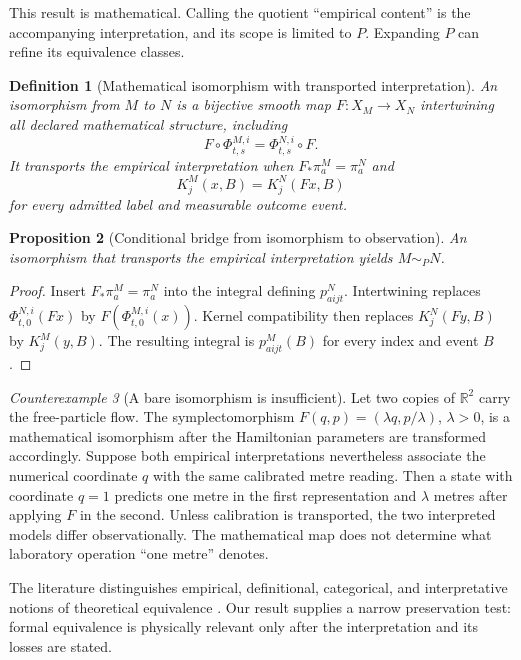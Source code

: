 \documentclass[11pt]{article}
\newtheorem{definition}{Definition}[section]
\newtheorem{proposition}[definition]{Proposition}
\theoremstyle{remark}
\newtheorem{counterexample}[definition]{Counterexample}
\newcommand{\Real}{\mathbb{R}}
\begin{document}
This result is mathematical.  Calling the quotient ``empirical content'' is the accompanying interpretation, and its scope is limited to $P$.  Expanding $P$ can refine its equivalence classes.

\begin{definition}[Mathematical isomorphism with transported interpretation]\label{def:iso}
An isomorphism from $M$ to $N$ is a bijective smooth map $F:X_M\to X_N$ intertwining all declared mathematical structure, including
\[
 F\circ\Phi^{M,i}_{t,s}=\Phi^{N,i}_{t,s}\circ F.
\]
It transports the empirical interpretation when $F_*\pi^M_a=\pi^N_a$ and
\[
 K^M_j(x,B)=K^N_j(Fx,B)
\]
for every admitted label and measurable outcome event.
\end{definition}

\begin{proposition}[Conditional bridge from isomorphism to observation]\label{prop:bridge}
An isomorphism that transports the empirical interpretation yields $M\sim_PN$.
\end{proposition}
\begin{proof}
Insert $F_*\pi^M_a=\pi^N_a$ into the integral defining $p^N_{aijt}$.  Intertwining replaces $\Phi^{N,i}_{t,0}(Fx)$ by $F(\Phi^{M,i}_{t,0}(x))$.  Kernel compatibility then replaces $K^N_j(Fy,B)$ by $K^M_j(y,B)$.  The resulting integral is $p^M_{aijt}(B)$ for every index and event $B$.
\end{proof}

\begin{counterexample}[A bare isomorphism is insufficient]\label{cx:units}
Let two copies of $\Real^2$ carry the free-particle flow.  The symplectomorphism $F(q,p)=(\lambda q,p/\lambda)$, $\lambda>0$, is a mathematical isomorphism after the Hamiltonian parameters are transformed accordingly.  Suppose both empirical interpretations nevertheless associate the numerical coordinate $q$ with the same calibrated metre reading.  Then a state with coordinate $q=1$ predicts one metre in the first representation and $\lambda$ metres after applying $F$ in the second.  Unless calibration is transported, the two interpreted models differ observationally.  The mathematical map does not determine what laboratory operation ``one metre'' denotes.
\end{counterexample}

The literature distinguishes empirical, definitional, categorical, and interpretative notions of theoretical equivalence \cite{Weatherall2019a,Weatherall2019b,Coffey2014}.  Our result supplies a narrow preservation test: formal equivalence is physically relevant only after the interpretation and its losses are stated.
\end{document}

